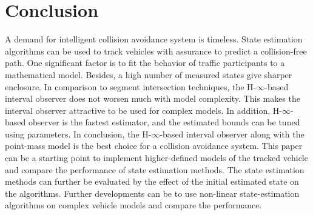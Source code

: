 \chapter{Conclusion} \label{ch:conclusion}
A demand for intelligent collision avoidance system is timeless. State estimation algorithms can be used to track vehicles with assurance to predict a collision-free path. One significant factor is to fit the behavior of traffic participants to a mathematical model. Besides, a high number of measured states give sharper enclosure. In comparison to segment intersection techniques, the H-$\infty$-based interval observer does not worsen much with model complexity. This makes the interval observer attractive to be used for complex models. In addition, H-$\infty$-based observer is the fastest estimator, and the estimated bounds can be tuned using parameters. In conclusion, the H-$\infty$-based interval observer along with the point-mass model is the best choice for a collision avoidance system. This paper can be a starting point to implement higher-defined models of the tracked vehicle and compare the performance of state estimation methods. The state estimation methods can further be evaluated by the effect of the initial estimated state on the algorithms. Further developments can be to use non-linear state-estimation algorithms on complex vehicle models and compare the performance.